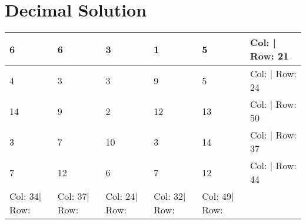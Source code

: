 \documentclass[]{article}
\begin{document}
 \section{Decimal Solution} 
\begin{tabular}{|l||l||l||l||l||l|}
\hline
 6             & 6             & 3             & 1             & 5             & Col: | Row: 21 \\ \hline
 4             & 3             & 3             & 9             & 5             & Col: | Row: 24 \\ \hline
 14            & 9             & 2             & 12            & 13            & Col: | Row: 50 \\ \hline
 3             & 7             & 10            & 3             & 14            & Col: | Row: 37 \\ \hline
 7             & 12            & 6             & 7             & 12            & Col: | Row: 44 \\ \hline
 Col: 34| Row: & Col: 37| Row: & Col: 24| Row: & Col: 32| Row: & Col: 49| Row: &                \\ \hline
\hline
\end{tabular}
 
\end{document}
